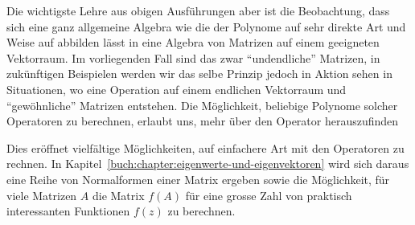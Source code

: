 Die wichtigste Lehre aus obigen Ausführungen aber ist
die Beobachtung, dass sich eine ganz allgemeine Algebra
wie die der Polynome auf sehr direkte Art und Weise auf
abbilden lässt in eine Algebra von Matrizen auf einem
geeigneten Vektorraum.
Im vorliegenden Fall sind das zwar ``undendliche''
Matrizen, in zukünftigen Beispielen werden wir das
selbe Prinzip jedoch in Aktion sehen in Situationen,
wo eine Operation auf einem endlichen Vektorraum
und ``gewöhnliche'' Matrizen entstehen.
Die Möglichkeit, beliebige Polynome solcher Operatoren
zu berechnen, erlaubt uns, mehr über den Operator 
herauszufinden

Dies eröffnet vielfältige Möglichkeiten, auf einfachere
Art mit den Operatoren zu rechnen.
In Kapitel~\ref{buch:chapter:eigenwerte-und-eigenvektoren}
wird sich daraus eine Reihe von Normalformen einer Matrix
ergeben sowie die Möglichkeit, für viele Matrizen $A$
die Matrix $f(A)$ für eine grosse Zahl von praktisch
interessanten Funktionen $f(z)$ zu berechnen.

